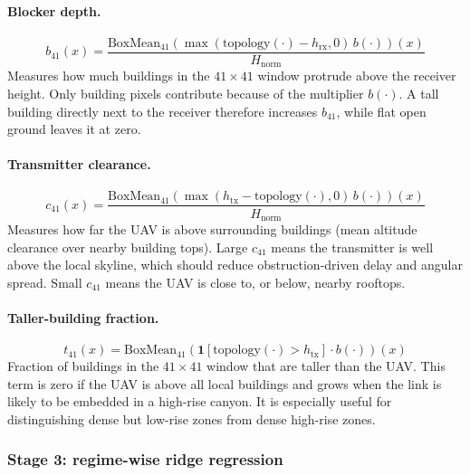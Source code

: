\paragraph{Blocker depth.}
\begin{equation}
b_{41}(x) = \frac{\mathrm{BoxMean}_{41}\!\left(\max(\mathrm{topology}(\cdot)-h_{\mathrm{rx}},0)\,b(\cdot)\right)(x)}{H_{\mathrm{norm}}}
\label{eq:b41}
\end{equation}
Measures how much buildings in the $41\times41$ window protrude above the receiver height.
Only building pixels contribute because of the multiplier \(b(\cdot)\). A tall
building directly next to the receiver therefore increases \(b_{41}\), while
flat open ground leaves it at zero.

\paragraph{Transmitter clearance.}
\begin{equation}
c_{41}(x) = \frac{\mathrm{BoxMean}_{41}\!\left(\max(h_{\mathrm{tx}}-\mathrm{topology}(\cdot),0)\,b(\cdot)\right)(x)}{H_{\mathrm{norm}}}
\label{eq:c41}
\end{equation}
Measures how far the UAV is above surrounding buildings (mean altitude clearance over nearby building tops).
Large \(c_{41}\) means the transmitter is well above the local skyline, which
should reduce obstruction-driven delay and angular spread. Small \(c_{41}\)
means the UAV is close to, or below, nearby rooftops.

\paragraph{Taller-building fraction.}
\begin{equation}
t_{41}(x) = \mathrm{BoxMean}_{41}\!\left(\mathbf{1}[\mathrm{topology}(\cdot)>h_{\mathrm{tx}}]\cdot b(\cdot)\right)(x)
\label{eq:t41}
\end{equation}
Fraction of buildings in the $41\times41$ window that are taller than the UAV.
This term is zero if the UAV is above all local buildings and grows when the
link is likely to be embedded in a high-rise canyon. It is especially useful
for distinguishing dense but low-rise zones from dense high-rise zones.

\subsubsection{Stage 3: regime-wise ridge regression}

